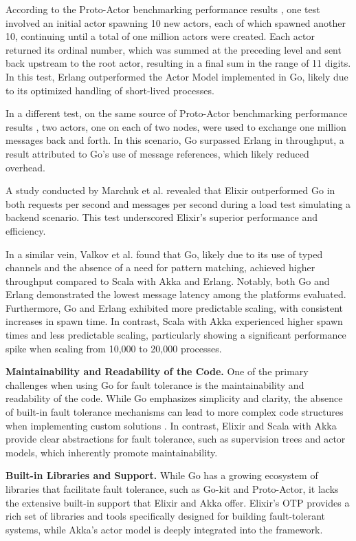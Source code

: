 According to the Proto-Actor benchmarking performance results \cite{proto-actor-docs}, one test involved an initial actor spawning 10 new actors, each of which spawned another 10, continuing until a total of one million actors were created. Each actor returned its ordinal number, which was summed at the preceding level and sent back upstream to the root actor, resulting in a final sum in the range of 11 digits. In this test, Erlang outperformed the Actor Model implemented in Go, likely due to its optimized handling of short-lived processes.

In a different test, on the same source of Proto-Actor benchmarking performance results \cite{proto-actor-docs}, two actors, one on each of two nodes, were used to exchange one million messages back and forth. In this scenario, Go surpassed Erlang in throughput, a result attributed to Go’s use of message references, which likely reduced overhead.

A study conducted by Marchuk et al. \cite{Marchuk2023} revealed that Elixir outperformed Go in both requests per second and messages per second during a load test simulating a backend scenario. This test underscored Elixir's superior performance and efficiency.

In a similar vein, Valkov et al. \cite{Valkov2018} found that Go, likely due to its use of typed channels and the absence of a need for pattern matching, achieved higher throughput compared to Scala with Akka and Erlang. Notably, both Go and Erlang demonstrated the lowest message latency among the platforms evaluated. Furthermore, Go and Erlang exhibited more predictable scaling, with consistent increases in spawn time. In contrast, Scala with Akka experienced higher spawn times and less predictable scaling, particularly showing a significant performance spike when scaling from 10,000 to 20,000 processes.

\textbf{Maintainability and Readability of the Code.} One of the primary challenges when using Go for fault tolerance is the maintainability and readability of the code. While Go emphasizes simplicity and clarity, the absence of built-in fault tolerance mechanisms can lead to more complex code structures when implementing custom solutions \cite{go-docs}. In contrast, Elixir and Scala with Akka provide clear abstractions for fault tolerance, such as supervision trees and actor models, which inherently promote maintainability.

\textbf{Built-in Libraries and Support.} While Go has a growing ecosystem of libraries that facilitate fault tolerance, such as Go-kit and Proto-Actor, it lacks the extensive built-in support that Elixir and Akka offer. Elixir's OTP provides a rich set of libraries and tools specifically designed for building fault-tolerant systems, while Akka's actor model is deeply integrated into the framework.

